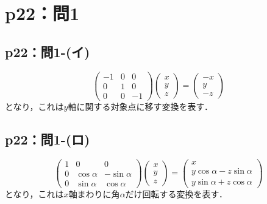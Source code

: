 \documentclass[a4paper,10pt,fleqn]{ltjsarticle}
\begin{document}
\newpage

\section*{p22：問1}


\subsection*{p22：問1-(イ)}
\begin{tleftbar}
    \[
        \begin{pmatrix}
            -1 & 0 & 0  \\
            0  & 1 & 0  \\
            0  & 0 & -1
        \end{pmatrix}
        \begin{pmatrix}
            x \\
            y \\
            z
        \end{pmatrix}
        =\begin{pmatrix}
            -x \\
            y  \\
            -z
        \end{pmatrix}
    \]
    となり，これは$y$軸に関する対象点に移す変換を表す．
\end{tleftbar}

\subsection*{p22：問1-(ロ)}
\begin{tleftbar}
    \[
        \begin{pmatrix}
            1 & 0           & 0            \\
            0 & \cos \alpha & -\sin \alpha \\
            0 & \sin \alpha & \cos \alpha
        \end{pmatrix}
        \begin{pmatrix}
            x \\
            y \\
            z
        \end{pmatrix}
        =
        \begin{pmatrix}
            x                            \\
            y \cos \alpha -z \sin \alpha \\
            y \sin \alpha + z \cos \alpha
        \end{pmatrix}
    \]
    となり，これは$x$軸まわりに角$\alpha$だけ回転する変換を表す．
\end{tleftbar}
\end{document}
